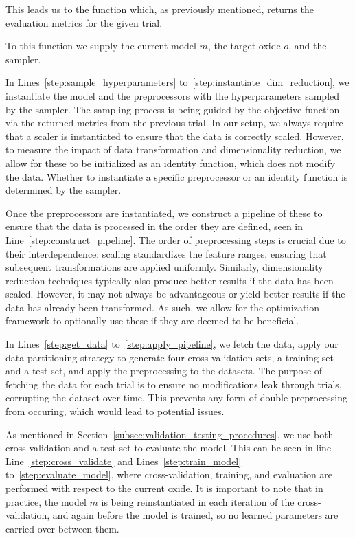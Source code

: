 This leads us to the  function which, as previously mentioned, returns the evaluation metrics for the given trial.

To this function we supply the current model $m$, the target oxide $o$, and the sampler.

In Lines~\ref{step:sample_hyperparameters} to~\ref{step:instantiate_dim_reduction}, we instantiate the model and the preprocessors with the hyperparameters sampled by the sampler.
The sampling process is being guided by the objective function via the returned metrics from the previous trial.
In our setup, we always require that a scaler is instantiated to ensure that the data is correctly scaled.
However, to measure the impact of data transformation and dimensionality reduction, we allow for these to be initialized as an identity function, which does not modify the data.
Whether to instantiate a specific preprocessor or an identity function is determined by the sampler.

Once the preprocessors are instantiated, we construct a pipeline of these to ensure that the data is processed in the order they are defined, seen in Line~\ref{step:construct_pipeline}.
The order of preprocessing steps is crucial due to their interdependence: scaling standardizes the feature ranges, ensuring that subsequent transformations are applied uniformly.
Similarly, dimensionality reduction techniques typically also produce better results if the data has been scaled.
However, it may not always be advantageous or yield better results if the data has already been transformed.
As such, we allow for the optimization framework to optionally use these if they are deemed to be beneficial.

In Lines~\ref{step:get_data} to~\ref{step:apply_pipeline}, we fetch the data, apply our data partitioning strategy to generate four cross-validation sets, a training set and a test set, and apply the preprocessing to the datasets.
The purpose of fetching the data for each trial is to ensure no modifications leak through trials, corrupting the dataset over time.
This prevents any form of double preprocessing from occuring, which would lead to potential issues.

As mentioned in Section~\ref{subsec:validation_testing_procedures}, we use both cross-validation and a test set to evaluate the model.
This can be seen in line Line~\ref{step:cross_validate} and Lines~\ref{step:train_model} to~\ref{step:evaluate_model}, where cross-validation, training, and evaluation are performed with respect to the current oxide.
It is important to note that in practice, the model $m$ is being reinstantiated in each iteration of the cross-validation, and again before the model is trained, so no learned parameters are carried over between them.

